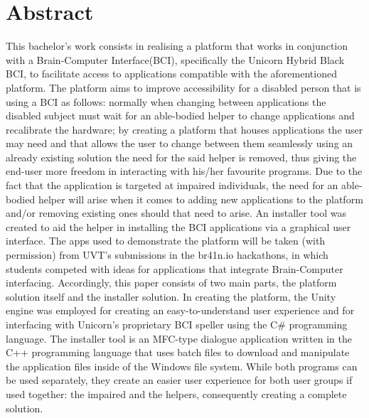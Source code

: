 \chapter*{Abstract}\label{cap:abstract_en}
This bachelor's work consists in realising a platform that works in conjunction with a Brain-Computer Interface(BCI), specifically the Unicorn Hybrid Black BCI\cite{Unicorn_Technology}, to facilitate access to applications compatible with the aforementioned platform. The platform aims to improve accessibility for a disabled person that is using a BCI as follows: normally when changing between applications the disabled subject must wait for an able-bodied helper to change applications and recalibrate the hardware; by creating a platform that houses applications the user may need and that allows the user to change between them seamlessly using an already existing solution\cite{Unicorn_Speller} the need for the said helper is removed, thus giving the end-user more freedom in interacting with his/her favourite programs. 
\vspace{\baselineskip}\newline
Due to the fact that the application is targeted at impaired individuals, the need for an able-bodied helper will arise when it comes to adding new applications to the platform and/or removing existing ones should that need to arise. An installer tool was created to aid the helper in installing the BCI applications via a graphical user interface. The apps used to demonstrate the platform will be taken (with permission) from UVT's submissions in the br41n.io hackathons, in which students competed with ideas for applications that integrate Brain-Computer interfacing.
\vspace{\baselineskip}\newline
Accordingly, this paper consists of two main parts, the platform solution itself and the installer solution. In creating the platform, the Unity engine was employed for creating an easy-to-understand user experience and for interfacing with Unicorn's proprietary BCI speller\cite{Unicorn_Speller} using the C\# programming language. The installer tool is an MFC-type dialogue application written in the C++ programming language that uses batch files to download and manipulate the application files inside of the Windows file system. While both programs can be used separately, they create an easier user experience for both user groups if used together: the impaired and the helpers, consequently creating a complete solution.
